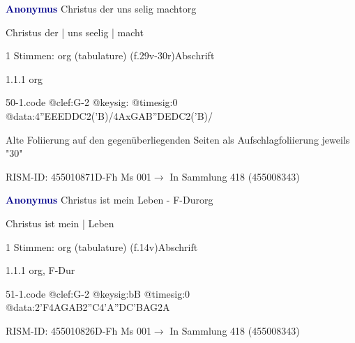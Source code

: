 \documentclass[twocolumn, 12pt]{book}
\begin{document}
\par \vspace{16pt} \textcolor{darkblue}{\textbf{Anonymus  }}\hfillplus{\textbf{[50]}}\newline Christus der uns selig macht\newline org
\par \begin{itshape}[f.29v, at left:] Christus der | uns seelig | macht\end{itshape} 
\par \textcolor{darkblue}{}  1 Stimmen: org (tabulature)  (f.29v-30r)\newline Abschrift
\par 1.1.1  org  
\begin{filecontents*}{50-1.code}
@clef:G-2
@keysig:
@timesig:0
@data:4''EEEDDC2('B)/4AxGAB''DEDC2('B)/
\end{filecontents*}
\newline %
\par Alte Foliierung auf den gegenüberliegenden Seiten als Aufschlagfoliierung jeweils "30"
\par RISM-ID: 455010871\newline D-Fh  Ms 001\newline $\rightarrow$ In Sammlung 418 (455008343)
      
\par \vspace{16pt} \textcolor{darkblue}{\textbf{Anonymus  }}\hfillplus{\textbf{[51]}}\newline Christus ist mein Leben - F-Dur\newline org
\par \begin{itshape}[f.14v, at left:] Christus ist mein | Leben\end{itshape} 
\par \textcolor{darkblue}{}  1 Stimmen: org (tabulature)  (f.14v)\newline Abschrift
\par 1.1.1  org, F-Dur  
\begin{filecontents*}{51-1.code}
@clef:G-2
@keysig:bB
@timesig:0
@data:2'F4AGAB2''C4'A''DC'BAG2A
\end{filecontents*}
\newline %
\par RISM-ID: 455010826\newline D-Fh  Ms 001\newline $\rightarrow$ In Sammlung 418 (455008343)
      
\end{document}
